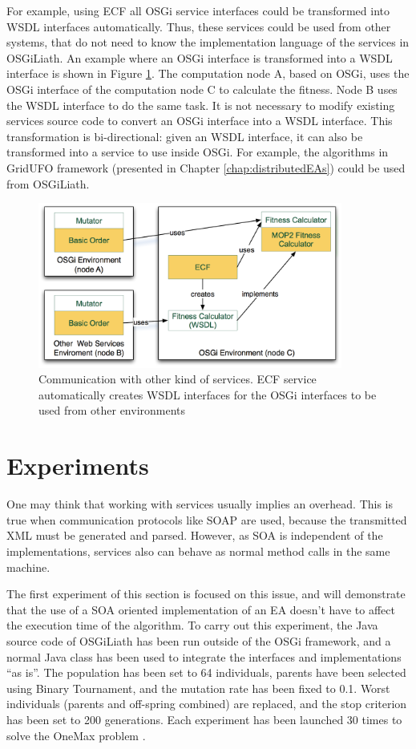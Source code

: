 For example, using ECF all OSGi service interfaces could be transformed into WSDL interfaces automatically. Thus, these services could be used from other systems, that do not need to know the implementation language of the services in OSGiLiath. An example where an OSGi interface is transformed into a WSDL interface is shown in Figure \ref{AXISFIGURE}. The computation node A, based on OSGi, uses the OSGi interface of the computation node C to calculate the fitness. Node B uses the WSDL interface to do the same task. It is not necessary to modify existing services source code to convert an OSGi interface into a WSDL interface. This transformation is bi-directional: given an WSDL interface, it can also be transformed into a service to use inside OSGi. For example, the algorithms in GridUFO framework (presented in Chapter \ref{chap:distributedEAs}) could be used from OSGiLiath.






\begin{figure}
\centering
\includegraphics[width=10cm]{gfx/osgiliath/axis.png}


\caption{Communication with other kind of services. ECF service automatically creates WSDL interfaces for the OSGi interfaces to be used from other environments}
\label{AXISFIGURE}
\end{figure}

\section{Experiments}
One may think that working with services usually implies an overhead. This is true when communication protocols like SOAP are used, because the transmitted XML must be generated and parsed. However, as SOA is independent of the implementations, services also can behave as normal method calls in the same machine.


The first experiment of this section is focused on this issue, and will demonstrate that the use of a SOA oriented implementation of an EA doesn't have to affect the execution time of the algorithm. To carry out this experiment, the Java source code of OSGiLiath has been run outside of the OSGi framework, and a normal Java class has been used to integrate the interfaces and implementations ``as is''. The population has been set to 64 individuals, parents have been selected using Binary Tournament, and the mutation rate has been fixed to 0.1. Worst individuals (parents and off-spring combined) are replaced, and the stop criterion has been set to 200 generations. Each experiment has been launched 30 times to solve the OneMax problem \cite{SchafferOnemax91}.



